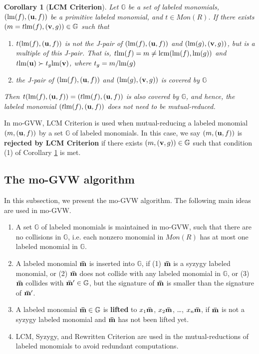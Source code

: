 \documentclass[final, number, 3p,12pt]{elsarticle}
\newtheorem{cor}[theorem]{Corollary}
\def\G{{\mathbb{G}}}
\def\brm{{\bf \bar{m}}}
\def\lm{{\rm lm}} %
\def\u{{\bf u}}
\def\v{{\bf v}}
\def\lcm{{\rm lcm}}
\begin{document}
\begin{cor}[{\bf LCM Criterion}]\label{cor_lcm}
Let $\G$ be a set of labeled monomials,  $(\lm(f), (\u, f))$ be a primitive labeled monomial, and $t\in Mon(R)$. If there exists $(m = t\lm(f), (\v, g))\in \G$ such that 
\begin{enumerate}[(1)]
\item $t(\lm(f), (\u, f))$ is not the J-pair of $(\lm(f), (\u, f))$ and $(\lm(g), (\v, g))$, but is a multiple of this J-pair. That is, $t\lm(f)=m \not= \lcm(\lm(f), \lm(g))$ and $t\lm(\u) \succ t_g\lm(\v)$, where $t_g = m/\lm(g)$ 

\item the J-pair of $(\lm(f), (\u, f))$ and $(\lm(g), (\v, g))$ is covered by $\G$
\end{enumerate}
Then $t(\lm(f), (\u, f)) = (t\lm(f), (\u, f))$ is also covered by $\G$, and hence, the labeled monomial $(t\lm(f), (\u, f))$ does not need to be mutual-reduced.
\end{cor}


In mo-GVW, LCM Criterion is used when mutual-reducing a labeled monomial $(m, (\u, f))$ by a set $\G$ of labeled monomials. In this case, we say $(m, (\u, f))$ is {\bf rejected by LCM Criterion} if there exists $(m, (\v, g))\in \G$ such that condition (1) of Corollary \ref{cor_lcm} is met.





\subsection{The mo-GVW algorithm} \label{subsec_algorithm}

In this subsection, we present the mo-GVW algorithm. The following main ideas are used in mo-GVW.

\begin{enumerate}

\item A set $\G$ of labeled monomials is maintained in mo-GVW, such that there are no collisions  in $\G$, i.e. each nonzero monomial in $Mon(R)$ has at most one labeled monomial in $\G$.

\item A labeled monomial $\brm$ is inserted into $\G$, if (1) $\brm$ is a syzygy labeled monomial, or (2) $\brm$ does not collide with any labeled monomial in $\G$, or (3) $\brm$ collides with $\brm' \in \G$, but the signature of $\brm$ is smaller than the signature of $\brm'$.

\item A labeled monomial $\brm \in \G$ is {\bf lifted} to $x_1\brm$, $x_2\brm$, \ldots, $x_n\brm$, if $\brm$ is not a syzygy labeled monomial and $\brm$ has not been lifted yet.

\item LCM, Syzygy, and Rewritten Criterion are used in the mutual-reductions of labeled monomials to avoid redundant computations. 

\end{enumerate}
\end{document}
